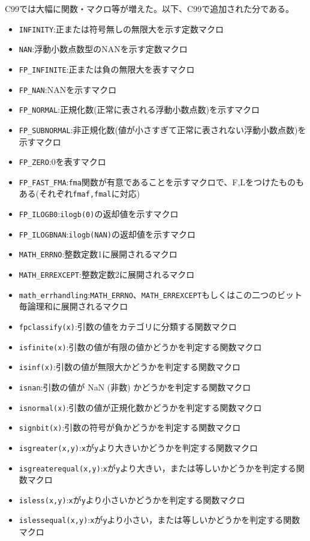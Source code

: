 C99では大幅に関数・マクロ等が増えた。以下、C99で追加された分である。
\begin{itemize}
\item \verb|INFINITY|:正または符号無しの無限大を示す定数マクロ
\item \verb|NAN|:浮動小数点数型のNANを示す定数マクロ
\item \verb|FP_INFINITE|:正または負の無限大を表すマクロ
\item \verb|FP_NAN|:NANを示すマクロ
\item \verb|FP_NORMAL|:正規化数(正常に表される浮動小数点数)を示すマクロ
\item \verb|FP_SUBNORMAL|:非正規化数(値が小さすぎて正常に表されない浮動小数点数)を示すマクロ
\item \verb|FP_ZERO|:0を表すマクロ
\item \verb|FP_FAST_FMA|:\verb|fma|関数が有意であることを示すマクロで、F,Lをつけたものもある(それぞれ\verb|fmaf,fmal|に対応)
\item \verb|FP_ILOGB0|:\verb|ilogb(0)|の返却値を示すマクロ
\item \verb|FP_ILOGBNAN|:\verb|ilogb(NAN)|の返却値を示すマクロ
\item \verb|MATH_ERRNO|:整数定数1に展開されるマクロ
\item \verb|MATH_ERREXCEPT|:整数定数2に展開されるマクロ
\item \verb|math_errhandling|:\verb|MATH_ERRNO|、\verb|MATH_ERREXCEPT|もしくはこの二つのビット毎論理和に展開されるマクロ
\item \verb|fpclassify(x)|:引数の値をカテゴリに分類する関数マクロ
\item \verb|isfinite(x)|:引数の値が有限の値かどうかを判定する関数マクロ
\item \verb|isinf(x)|:引数の値が無限大かどうかを判定する関数マクロ
\item \verb|isnan|:引数の値が NaN (非数) かどうかを判定する関数マクロ
\item \verb|isnormal(x)|:引数の値が正規化数かどうかを判定する関数マクロ
\item \verb|signbit(x)|:引数の符号が負かどうかを判定する関数マクロ
\item \verb|isgreater(x,y)|:\verb|x|が\verb|y|より大きいかどうかを判定する関数マクロ
\item \verb|isgreaterequal(x,y)|:\verb|x|が\verb|y|より大きい，または等しいかどうかを判定する関数マクロ
\item \verb|isless(x,y)|:\verb|x|が\verb|y|より小さいかどうかを判定する関数マクロ
\item \verb|islessequal(x,y)|:\verb|x|が\verb|y|より小さい，または等しいかどうかを判定する関数マクロ

\end{itemize}
